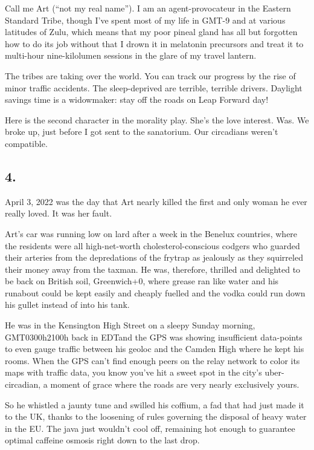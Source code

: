 Call me Art (“not my real name”). I am an agent-provocateur in the
Eastern Standard Tribe, though I’ve spent most of my life in GMT-9
and at various latitudes of Zulu, which means that my poor pineal
gland has all but forgotten how to do its job without that I drown
it in melatonin precursors and treat it to multi-hour
nine-kilolumen sessions in the glare of my travel lantern.

The tribes are taking over the world. You can track our progress by
the rise of minor traffic accidents. The sleep-deprived are
terrible, terrible drivers. Daylight savings time is a widowmaker:
stay off the roads on Leap Forward day!

Here is the second character in the morality play. She’s the love
interest. Was. We broke up, just before I got sent to the
sanatorium. Our circadians weren’t compatible.

\subsection{4.}

April 3, 2022 was the day that Art nearly killed the first and only
woman he ever really loved. It was her fault.

Art’s car was running low on lard after a week in the Benelux
countries, where the residents were all high-net-worth
cholesterol-conscious codgers who guarded their arteries from the
depredations of the frytrap as jealously as they squirreled their
money away from the taxman. He was, therefore, thrilled and
delighted to be back on British soil, Greenwich+0, where grease ran
like water and his runabout could be kept easily and cheaply
fuelled and the vodka could run down his gullet instead of into his
tank.

He was in the Kensington High Street on a sleepy Sunday morning,
GMT0300h{\dash}2100h back in EDT{\dash}and the GPS was showing insufficient
data-points to even gauge traffic between his geoloc and the Camden
High where he kept his rooms. When the GPS can’t find enough peers
on the relay network to color its maps with traffic data, you know
you’ve hit a sweet spot in the city’s uber-circadian, a moment of
grace where the roads are very nearly exclusively yours.

So he whistled a jaunty tune and swilled his coffium, a fad that
had just made it to the UK, thanks to the loosening of rules
governing the disposal of heavy water in the EU. The java just
wouldn’t cool off, remaining hot enough to guarantee optimal
caffeine osmosis right down to the last drop.

